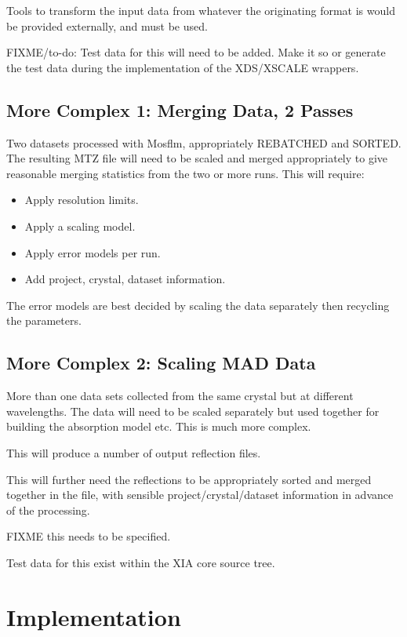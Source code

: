 \documentclass[a4paper, 11pt]{article}
\begin{document}
Tools to transform the input data from whatever the originating format is
would be provided externally, and must be used.

FIXME/to-do: Test data for this will need to be added. Make it so or generate
the test data during the implementation of the XDS/XSCALE wrappers.

\subsection{More Complex 1: Merging Data, 
2 Passes}

Two datasets processed with Mosflm, appropriately REBATCHED and SORTED. The
resulting MTZ file will need to be scaled and merged appropriately to give
reasonable merging statistics from the two or more runs. This will require:

\begin{itemize}
\item{Apply resolution limits.}
\item{Apply a scaling model.}
\item{Apply error models per run.}
\item{Add project, crystal, dataset information.}
\end{itemize}

The error models are best decided by scaling the data separately then 
recycling the parameters.

\subsection{More Complex 2: Scaling MAD Data}

More than one data sets collected from the same crystal but at different 
wavelengths. The data will need to be scaled separately but used together
for building the absorption model etc. This is much more complex.

This will produce a number of output reflection files.

This will further need the reflections to be appropriately sorted and 
merged together in the file, with sensible project/crystal/dataset information
in advance of the processing.

FIXME this needs to be specified.

Test data for this exist within the XIA core source tree.

\section{Implementation}
\end{document}
